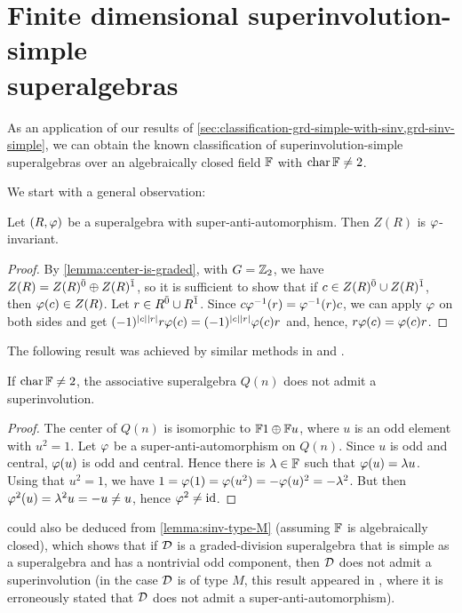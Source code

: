 
\section[Finite dimensional superinvolution-simple superalgebras]{Finite dimensional superinvolution-simple \\ superalgebras}\label{sec:sinv-simple}

As an application of our results of \cref{sec:classification-grd-simple-with-sinv,grd-sinv-simple}, we can obtain the known classification of superinvolution-simple superalgebras over an algebraically closed field $\mathbb{F}$ with $\operatorname{char} \mathbb{F} \neq 2$. 

We start with a general observation: 

\begin{lemma}
	Let $(R, \varphi)$ be a superalgebra with super-anti-automorphism.
	Then $Z(R)$ is $\varphi$-invariant.
\end{lemma}

\begin{proof}
	By \cref{lemma:center-is-graded}, with $G = \mathbb{Z}_2$, we have $Z(R) = Z(R)^{\bar0} \oplus Z(R)^{\bar1}$, so it is sufficient to show that if $c \in Z(R)^{\bar0} \cup Z(R)^{\bar1}$, then $\varphi(c) \in Z(R)$. 
	Let $r \in R^{\bar0} \cup R^{\bar1}$.
	Since $c\varphi^{-1} (r) = \varphi^{-1} (r)c$, we can apply $\varphi$ on both sides and get $(-1)^{|c||r|} r \varphi(c) = (-1)^{|c||r|} \varphi(c) r$ and, hence, $r \varphi(c) = \varphi(c) r$.
\end{proof}

The following result was achieved by similar methods in \cite[Theorem 8.1]{Sh98} and \cite[Theorem 28]{MR2407903}. 

\begin{cor}\label{cor:Q-no-sinv-center}
	If $\operatorname{char} \mathbb{F} \neq 2$, the associative superalgebra $Q(n)$ does not admit a superinvolution.
\end{cor}

\begin{proof}
	The center of $Q(n)$ is isomorphic to $\mathbb{F}1 \oplus \mathbb{F} u$, where $u$ is an odd element with $u^2 = 1$.
	Let $\varphi$ be a super-anti-automorphism on $Q(n)$.
	Since $u$ is odd and central, $\varphi(u)$ is odd and central.
	Hence there is $\lambda \in \mathbb{F}$ such that $\varphi(u) = \lambda u$.
	Using that $u^2 = 1$, we have $1 = \varphi(1) = \varphi(u^2) = - \varphi(u)^2 = - \lambda^2$.
	But then $\varphi^2 (u) = \lambda^2 u = -u \neq u$, hence $\varphi^2 \neq \operatorname{id}$.
\end{proof}

\begin{remark}
     could also be deduced from \cref{lemma:sinv-type-M} (assuming $\mathbb{F}$ is algebraically closed), which shows that if $\mathcal{D}$ is a graded-division superalgebra that is simple as a superalgebra and has a nontrivial odd component, then $\mathcal{D}$ does not admit a superinvolution (in the case $\mathcal{D}$ is of type $M$, this result appeared in \cite[Theorem 3]{BTT}, where it is erroneously stated that $\mathcal{D}$ does not admit a super-anti-automorphism). 
\end{remark}

